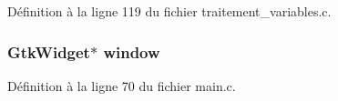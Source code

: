 Définition à la ligne 119 du fichier traitement\_\-variables.c.

\subsubsection[{window}]{\setlength{\rightskip}{0pt plus 5cm}GtkWidget$\ast$ {\bf window}}\label{gsb__calendar__entry_8c_a3d346c08cf2d67c388caabffb412b293}


Définition à la ligne 70 du fichier main.c.

